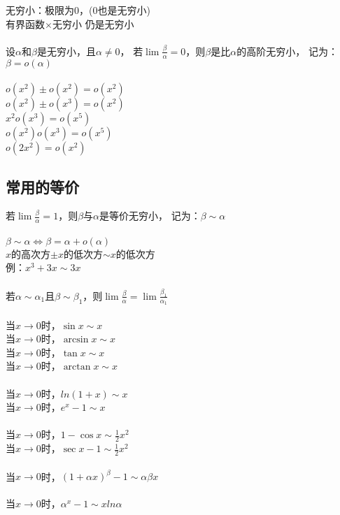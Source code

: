 \documentclass{article}
\begin{document}
\begin{flushleft}
无穷小：极限为0，(0也是无穷小)\\
有界函数$\times$无穷小 仍是无穷小\\
~\\
设$\alpha$和$\beta$是无穷小，且$\alpha \neq 0$，
若$\lim \frac{\beta}{\alpha}=0$，则$\beta$是比$\alpha$的高阶无穷小，
记为：$\beta = o(\alpha)$\\
~\\
$o(x^2)\pm o(x^2)=o(x^2)$\\
$o(x^2)\pm o(x^3)=o(x^2)$\\
$x^2 o(x^3)=o(x^5)$\\
$o(x^2) o(x^3)=o(x^5)$\\
$o(2x^2)=o(x^2)$\\

\subsection{常用的等价}

若$\lim \frac{\beta}{\alpha}=1$，则$\beta$与$\alpha$是等价无穷小，
记为：$\beta \sim \alpha$\\
~\\
$\beta \sim \alpha \Leftrightarrow \beta = \alpha + o(\alpha)$\\
$x$的高次方$\pm x$的低次方$\sim x$的低次方\\
\qquad 例：$x^3+3x\sim 3x$\\
~\\
若$\alpha \sim \alpha_1$且$\beta \sim \beta_1$，则$\lim \frac{\beta}{\alpha} = \lim \frac{\beta_1}{\alpha_1}$\\
~\\
当$x\to 0$时，$\sin x \sim x$\\
当$x\to 0$时，$\arcsin x \sim x$\\
当$x\to 0$时，$\tan x \sim x$\\
当$x\to 0$时，$\arctan x \sim x$\\
~\\
当$x\to 0$时，$ln(1+x) \sim x$\\
当$x\to 0$时，$e^x-1 \sim x$\\
~\\
当$x\to 0$时，$1-\cos x \sim \frac{1}{2} x^2$\\
当$x\to 0$时，$\sec x - 1 \sim \frac{1}{2} x^2$\\
~\\
当$x\to 0$时，$(1+\alpha x)^\beta -1 \sim \alpha\beta x$\\
~\\
当$x\to 0$时，$\alpha^x -1 \sim xln\alpha$\\


\end{flushleft}
\end{document}

